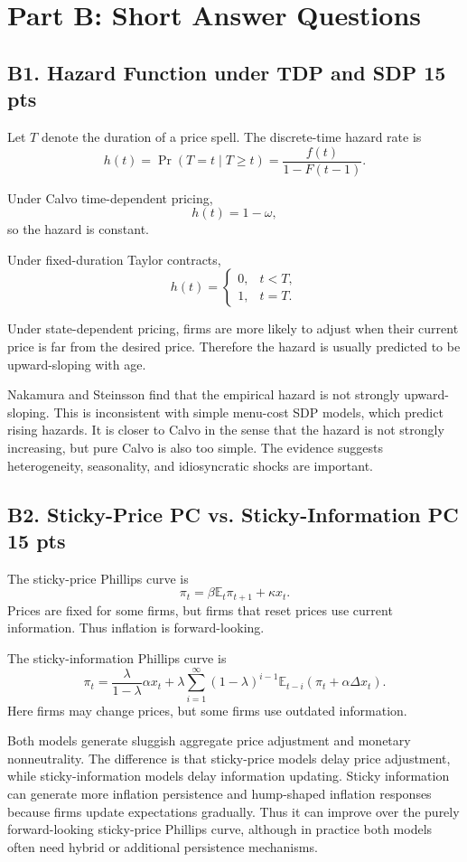 \documentclass[11pt]{article}
\begin{document}
\section*{Part B: Short Answer Questions}

\subsection*{B1. Hazard Function under TDP and SDP \hfill 15 pts}

Let \(T\) denote the duration of a price spell. The discrete-time hazard rate is
\[
h(t)=\Pr(T=t\mid T\geq t)
=
\frac{f(t)}{1-F(t-1)}.
\]

Under Calvo time-dependent pricing,
\[
h(t)=1-\omega,
\]
so the hazard is constant.

Under fixed-duration Taylor contracts,
\[
h(t)=
\begin{cases}
0, & t<T,\\
1, & t=T.
\end{cases}
\]

Under state-dependent pricing, firms are more likely to adjust when their current price is far from the desired price. Therefore the hazard is usually predicted to be upward-sloping with age.

Nakamura and Steinsson find that the empirical hazard is not strongly upward-sloping. This is inconsistent with simple menu-cost SDP models, which predict rising hazards. It is closer to Calvo in the sense that the hazard is not strongly increasing, but pure Calvo is also too simple. The evidence suggests heterogeneity, seasonality, and idiosyncratic shocks are important.

\subsection*{B2. Sticky-Price PC vs. Sticky-Information PC \hfill 15 pts}

The sticky-price Phillips curve is
\[
\pi_t=\beta \mathbb{E}_t\pi_{t+1}+\kappa x_t.
\]
Prices are fixed for some firms, but firms that reset prices use current information. Thus inflation is forward-looking.

The sticky-information Phillips curve is
\[
\pi_t
=
\frac{\lambda}{1-\lambda}\alpha x_t
+
\lambda\sum_{i=1}^{\infty}(1-\lambda)^{i-1}
\mathbb{E}_{t-i}\left(\pi_t+\alpha\Delta x_t\right).
\]
Here firms may change prices, but some firms use outdated information.

Both models generate sluggish aggregate price adjustment and monetary nonneutrality. The difference is that sticky-price models delay price adjustment, while sticky-information models delay information updating. Sticky information can generate more inflation persistence and hump-shaped inflation responses because firms update expectations gradually. Thus it can improve over the purely forward-looking sticky-price Phillips curve, although in practice both models often need hybrid or additional persistence mechanisms.
\end{document}
